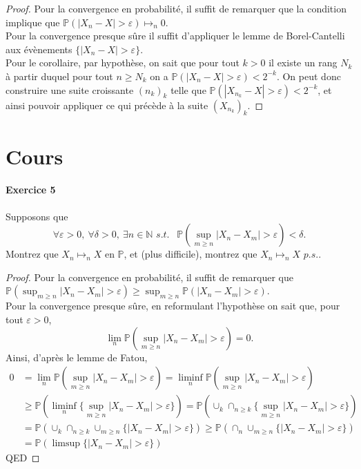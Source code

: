 \documentclass{article}
\theoremstyle{definition}
\numberwithin{equation}{section}
\begin{document}
\begin{proof}
Pour la convergence en probabilité, il suffit de remarquer que la condition implique que $\mathbb{P}(|X_n-X|>\varepsilon)\mapsto_n 0$.\\
Pour la convergence presque sûre il suffit d'appliquer le lemme de Borel-Cantelli aux évènements $\{|X_n-X|>\varepsilon\}$.\\
Pour le corollaire, par hypothèse, on sait que pour tout $k>0$ il existe un rang $N_k$ à partir duquel pour tout $n\geq N_k$ on a $\mathbb{P}(|X_n-X|>\varepsilon)<2^{-k}$. On peut donc construire une suite croissante $(n_k)_k$ telle que $\mathbb{P}(|X_{n_k}-X|>\varepsilon)<2^{-k}$, et ainsi pouvoir appliquer ce qui précède à la suite $(X_{n_k})_k$.
\end{proof}


\section{Cours}


\paragraph{Exercice 5}
Supposons que 
$$\forall \varepsilon>0,~\forall\delta>0,~\exists n\in\mathbb{N} \textit{ s.t. }~~\mathbb{P}(\sup_{m\geq n} |X_n-X_m|>\varepsilon)<\delta.$$
Montrez que $X_n \mapsto_n X \text{ en } \mathbb{P}$, et (plus difficile), montrez que $X_n \mapsto_n X \textit{ p.s.}$.

\begin{proof}
Pour la convergence en probabilité, il suffit de remarquer que $\mathbb{P}(\sup_{m\geq n} |X_n-X_m|>\varepsilon)\geq \sup_{m\geq n} \mathbb{P}(|X_n-X_m|>\varepsilon)$.\\
Pour la convergence presque sûre, en reformulant l'hypothèse on sait que, pour tout $\varepsilon>0$,
$$\lim_n \mathbb{P}(\sup_{m\geq n}|X_n-X_m|>\varepsilon)=0.$$
Ainsi, d'après le lemme de Fatou,
\begin{align*}
0&= \lim_n \mathbb{P}(\sup_{m\geq n}|X_n-X_m|>\varepsilon) = \liminf_n \mathbb{P}(\sup_{m\geq n}|X_n-X_m|>\varepsilon) \\
&\geq \mathbb{P}(\liminf_n \{ \sup_{m\geq n}|X_n-X_m|>\varepsilon\}) = \mathbb{P}(\cup_k \cap_{n\geq k} \{ \sup_{m\geq n}|X_n-X_m|>\varepsilon\})\\
&= \mathbb{P}(\cup_k \cap_{n\geq k}  \cup_{m\geq n} \{|X_n-X_m|>\varepsilon\}) \geq \mathbb{P}( \cap_n  \cup_{m\geq n} \{|X_n-X_m|>\varepsilon\})\\
&= \mathbb{P}(\limsup \{|X_n-X_m|>\varepsilon\})
\end{align*}
QED
\end{proof}
\end{document}
